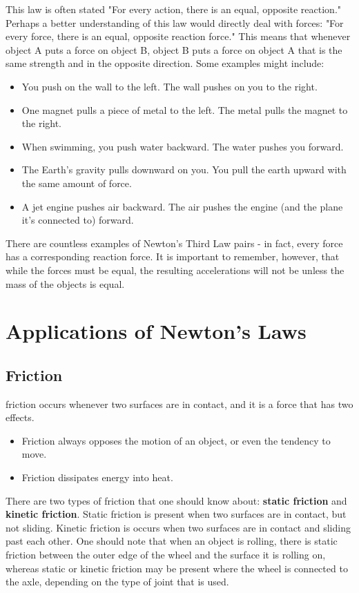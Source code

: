 	This law is often stated "For every action, there is an equal, opposite reaction."  Perhaps a better understanding of this law would directly deal with forces: "For every force, there is an equal, opposite reaction force."  This means that whenever object A puts a force on object B, object B puts a force on object A that is the same strength and in the opposite direction.  Some examples might include:
	\begin{itemize}
		\item You push on the wall to the left.  The wall pushes on you to the right.
		\item One magnet pulls a piece of metal to the left.  The metal pulls the magnet to the right.
		\item When swimming, you push water backward.  The water pushes you forward.  
		\item The Earth's gravity pulls downward on you.  You pull the earth upward with the same amount of force.
		\item A jet engine pushes air backward.  The air pushes the engine (and the plane it's connected to) forward.
	\end{itemize}
	There are countless examples of Newton's Third Law pairs - in fact, every force has a corresponding reaction force.  It is important to remember, however, that while the forces must be equal, the resulting accelerations will not be unless the mass of the objects is equal.  
	
	\newpage
	
	\section{Applications of Newton's Laws}
		\subsection{Friction}
		\gls{friction} occurs whenever two surfaces are in contact, and it is a force that has two effects.  
		\begin{itemize}
			\item Friction always opposes the motion of an object, or even the tendency to move.
			\item Friction dissipates energy into heat.
		\end{itemize}
		
		 
		There are two types of friction that one should know about: \textbf{static friction} and \textbf{kinetic friction}.  Static friction is present when two surfaces are in contact, but not sliding.  Kinetic friction is occurs when two surfaces are in contact and sliding past each other.  One should note that when an object is rolling, there is static friction between the outer edge of the wheel and the surface it is rolling on, whereas static or kinetic friction may be present where the wheel is connected to the axle, depending on the type of joint that is used.  
		
